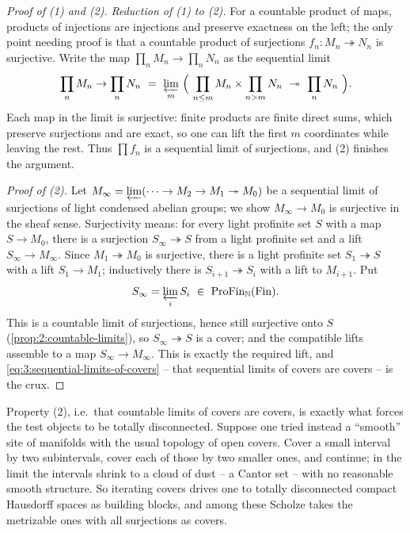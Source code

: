 \begin{proof}[Proof of \textup{(1)} and \textup{(2)}]
\emph{Reduction of \textup{(1)} to \textup{(2)}.} For a countable product of
maps, products of injections are injections and preserve exactness on the left;
the only point needing proof is that a countable product of surjections
$f_n\colon M_n\twoheadrightarrow N_n$ is surjective. Write the map
$\prod_n M_n\to\prod_n N_n$ as the sequential limit
\begin{equation*}
\prod_n M_n\to\prod_n N_n\ =\
\varprojlim_m\ \Bigl(\ \prod_{n\leq m} M_n\times\prod_{n>m} N_n\
\twoheadrightarrow\ \prod_n N_n\ \Bigr).
\end{equation*}
Each map in the limit is surjective: finite products are finite direct sums,
which preserve surjections and are exact, so one can lift the first $m$
coordinates while leaving the rest. Thus $\prod f_n$ is a sequential limit of
surjections, and \textup{(2)} finishes the argument.

\emph{Proof of \textup{(2)}.} Let $M_\infty=\varprojlim(\cdots\to M_2\to
M_1\twoheadrightarrow M_0)$ be a sequential limit of surjections of light
condensed abelian groups; we show $M_\infty\to M_0$ is surjective in the sheaf
sense. Surjectivity means: for every light profinite set $S$ with a map $S\to
M_0$, there is a surjection $S_\infty\twoheadrightarrow S$ from a light profinite
set and a lift $S_\infty\to M_\infty$. Since $M_1\twoheadrightarrow M_0$ is
surjective, there is a light profinite set $S_1\twoheadrightarrow S$ with a lift
$S_1\to M_1$; inductively there is $S_{i+1}\twoheadrightarrow S_i$ with a lift to
$M_{i+1}$. Put
\begin{equation*}
S_\infty=\varprojlim_i S_i\ \in\ \ProFin_{\mathbb{N}}(\mathrm{Fin}).
\end{equation*}
This is a countable limit of surjections, hence still surjective onto $S$
(\cref{prop:2:countable-limits}), so $S_\infty\twoheadrightarrow S$ is a cover;
and the compatible lifts assemble to a map $S_\infty\to M_\infty$. This is
exactly the required lift, and \eqref{eq:3:sequential-limits-of-covers} -- that
sequential limits of covers are covers -- is the crux.
\end{proof}

\begin{remark}
\label{rmk:3:totally-disconnected-forced}
\ts{00:53:27}
Property (2), i.e.\ that countable limits of covers are covers, is exactly what
forces the test objects to be totally disconnected. Suppose one tried instead a
``smooth'' site of manifolds with the usual topology of open covers. Cover a
small interval by two subintervals, cover each of those by two smaller ones, and
continue; in the limit the intervals shrink to a cloud of dust -- a Cantor set
-- with no reasonable smooth structure. So iterating covers drives one to
totally disconnected compact Hausdorff spaces as building blocks, and among these
Scholze takes the metrizable ones with all surjections as covers.
\end{remark}

